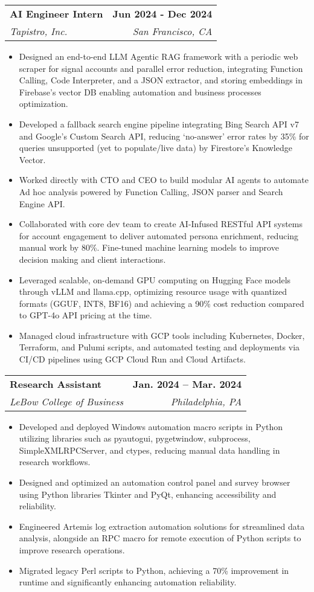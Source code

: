 \documentclass[letterpaper,10pt]{article}
\makeatletter
\newcommand{\resumeItem}[1]{
  \item\small{
    {#1 \vspace{-5pt}}
  }
}
\newcommand{\resumeSubheading}[4]{
  \vspace{0pt}\item
    \begin{tabular*}{0.97\textwidth}[t]{l@{\extracolsep{\fill}}r}
      \textbf{#1} & \textbf{#2} \\
      \textit{\small#3} & \textit{\small #4} \\
    \end{tabular*}\vspace{-10pt}
}
\newcommand{\resumeItemListStart}{\begin{itemize}}
\newcommand{\resumeItemListEnd}{\end{itemize}\vspace{-5pt}}
\makeatother
\begin{document}
  \resumeSubheading
    {AI Engineer Intern}{Jun 2024 - Dec 2024}
    {Tapistro, Inc.}{San Francisco, CA}
    \resumeItemListStart
      \resumeItem{Designed an end-to-end LLM Agentic RAG framework with a periodic web scraper for signal accounts and parallel error reduction, integrating Function Calling, Code Interpreter, and a JSON extractor, and storing embeddings in Firebase’s vector DB enabling automation and business processes optimization.}
      \resumeItem{Developed a fallback search engine pipeline integrating Bing Search API v7 and Google’s Custom Search API, reducing ‘no-answer’ error rates by 35\% for queries unsupported (yet to populate/live data) by Firestore’s Knowledge Vector.}
      \resumeItem{Worked directly with CTO and CEO to build modular AI agents to automate Ad hoc analysis powered by Function Calling, JSON parser and Search Engine API.}
      \resumeItem{Collaborated with core dev team to create AI-Infused RESTful API systems for account engagement to deliver automated persona enrichment, reducing manual work by 80\%. Fine-tuned machine learning models to improve decision making and client interactions.}
      \resumeItem{Leveraged scalable, on-demand GPU computing on Hugging Face models through vLLM and llama.cpp, optimizing resource usage with quantized formats (GGUF, INT8, BF16) and achieving a 90\% cost reduction compared to GPT-4o API pricing at the time.}
      \resumeItem{Managed cloud infrastructure with GCP tools including Kubernetes, Docker, Terraform, and Pulumi scripts, and automated testing and deployments via CI/CD pipelines using GCP Cloud Run and Cloud Artifacts.}
    \resumeItemListEnd

  
  \resumeSubheading
    {Research Assistant}{Jan. 2024 -- Mar. 2024}
    {LeBow College of Business}{Philadelphia, PA}
    \resumeItemListStart
      \resumeItem{Developed and deployed Windows automation macro scripts in Python utilizing libraries such as pyautogui, pygetwindow, subprocess, SimpleXMLRPCServer, and ctypes, reducing manual data handling in research workflows.}
      \resumeItem{Designed and optimized an automation control panel and survey browser using Python libraries Tkinter and PyQt, enhancing accessibility and reliability.}
      \resumeItem{Engineered Artemis log extraction automation solutions for streamlined data analysis, alongside an RPC macro for remote execution of Python scripts to improve research operations.}
      \resumeItem{Migrated legacy Perl scripts to Python, achieving a 70\% improvement in runtime and significantly enhancing automation reliability.}
    \resumeItemListEnd
      
\end{document}
